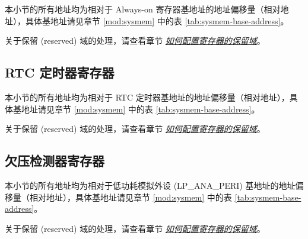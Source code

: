 \documentclass[main\_\_CN.tex]{subfiles}
\begin{document}
本小节的所有地址均为相对于 Always-on 寄存器基地址的地址偏移量（相对地址），具体基地址请见章节 \ref{mod:sysmem} \textit{} 中的表 \ref{tab:sysmem-base-address}。

关于保留 (reserved) 域的处理，请查看章节 \hyperref[programming-reserved-field]{\textit{如何配置寄存器的保留域}}。



\subsection{RTC 定时器寄存器}

本小节的所有地址均为相对于 RTC 定时器基地址的地址偏移量（相对地址），具体基地址请见章节 \ref{mod:sysmem} \textit{} 中的表 \ref{tab:sysmem-base-address}。

关于保留 (reserved) 域的处理，请查看章节 \hyperref[programming-reserved-field]{\textit{如何配置寄存器的保留域}}。



\subsection{欠压检测器寄存器}

本小节的所有地址均为相对于低功耗模拟外设 (LP\_ANA\_PERI) 基地址的地址偏移量（相对地址），具体基地址请见章节 \ref{mod:sysmem} \textit{} 中的表 \ref{tab:sysmem-base-address}。

关于保留 (reserved) 域的处理，请查看章节 \hyperref[programming-reserved-field]{\textit{如何配置寄存器的保留域}}。


\end{document}

